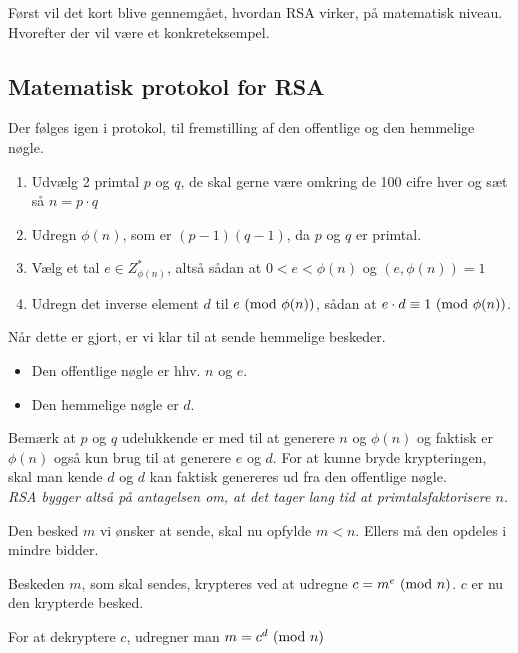 Først vil det kort blive gennemgået, hvordan RSA virker, på matematisk niveau. Hvorefter der vil være et konkreteksempel.

\subsection{Matematisk protokol for RSA}\label{rsaprot}
Der følges igen i protokol, til fremstilling af den offentlige og den hemmelige nøgle.\cite[1]{audata}

\begin{enumerate}[label*=(\arabic*)] %
    \item Udvælg 2 primtal \(p\) og \(q\), de skal gerne være omkring de 100 cifre hver og sæt så \(n = p \cdot q\)
    \item Udregn \(\phi(n)\), som er \((p - 1) (q - 1)\), da \(p\) og \(q\) er primtal.
    \item Vælg et tal \(e \in Z_{\phi(n)}^*\), altså sådan at \(0 < e < \phi(n)\) og \((e, \phi(n)) = 1\)
    \item Udregn det inverse element \(d\) til \(e \ (\mathrm{mod}\ \phi(n))\), sådan at \(e \cdot d \equiv 1 \ (\mathrm{mod}\ \phi(n))\). \label{stepfour}
\end{enumerate}

Når dette er gjort, er vi klar til at sende hemmelige beskeder.

\begin{itemize} %
    \item Den offentlige nøgle er hhv. \(n\) og \(e\).
    \item Den hemmelige nøgle er \(d\).
\end{itemize}

Bemærk at \(p\) og \(q\) udelukkende er med til at generere \(n\) og \(\phi(n)\) og faktisk er \(\phi(n)\) også kun brug til at generere \(e\) og \(d\).
For at kunne bryde krypteringen, skal man kende \(d\) og \(d\) kan faktisk genereres ud fra den offentlige nøgle.\\
\emph{RSA bygger altså på antagelsen om, at det tager lang tid at primtalsfaktorisere \(n\).}
\par

Den besked \(m\) vi ønsker at sende, skal nu opfylde \(m < n\). Ellers må den opdeles i mindre bidder.

Beskeden \(m\), som skal sendes, krypteres ved at udregne \(c = m^e \ (\mathrm{mod}\ n)\). \(c\) er nu den krypterde besked.

For at dekryptere \(c\), udregner man \(m = c^d \ (\mathrm{mod}\ n)\)

